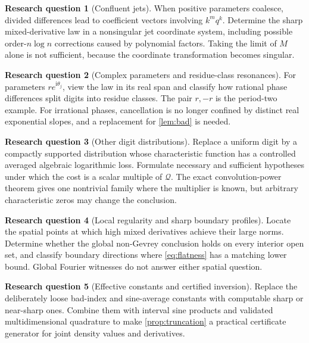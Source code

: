 \documentclass[11pt,a4paper]{article}
\numberwithin{equation}{section}
\theoremstyle{definition}
\newtheorem{question}{Research question}
\theoremstyle{remark}\newtheorem{remark}[theorem]{Remark}
\newcommand{\ii}{\mathrm i}
\newcommand{\Qf}{\mathcal Q}
\begin{document}
\begin{question}[Confluent jets]
When positive parameters coalesce, divided differences lead to coefficient
vectors involving $k^mq^k$. Determine the sharp mixed-derivative law in a
nonsingular jet coordinate system, including possible order-$n\log n$
corrections caused by polynomial factors. Taking the limit of $M$ alone is
not sufficient, because the coordinate transformation becomes singular.
\end{question}

\begin{question}[Complex parameters and residue-class resonances]
For parameters $re^{\ii\theta_j}$, view the law in its real span and classify
how rational phase differences split digits into residue classes. The pair
$r,-r$ is the period-two example. For irrational phases, cancellation is no
longer confined by distinct real exponential slopes, and a replacement for
\cref{lem:bad} is needed.
\end{question}

\begin{question}[Other digit distributions]
Replace a uniform digit by a compactly supported distribution whose
characteristic function has a controlled averaged algebraic logarithmic
loss. Formulate necessary and sufficient hypotheses under which the cost
is a scalar multiple of $\Qf$. The exact convolution-power theorem gives one
nontrivial family where the multiplier is known, but arbitrary characteristic
zeros may change the conclusion.
\end{question}

\begin{question}[Local regularity and sharp boundary profiles]
Locate the spatial points at which high mixed derivatives achieve their
large norms. Determine whether the global non-Gevrey conclusion holds on
every interior open set, and classify boundary directions where
\eqref{eq:flatness} has a matching lower bound. Global Fourier witnesses do
not answer either spatial question.
\end{question}

\begin{question}[Effective constants and certified inversion]
Replace the deliberately loose bad-index and sine-average constants with
computable sharp or near-sharp ones. Combine them with interval sine
products and validated multidimensional quadrature to make
\cref{prop:truncation} a practical certificate generator for joint density
values and derivatives.
\end{question}
\end{document}
